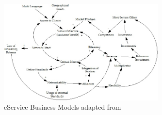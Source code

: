 \begin{figure}[tb]
	\centering
	\includegraphics[width=0.75\textwidth]{gfx/cld_klueber}
	\caption[eService Business Models]{eService Business Models adapted from \citet[p. 798]{Klueber2000}}
	\label{fig:cld_kl}
\end{figure}

